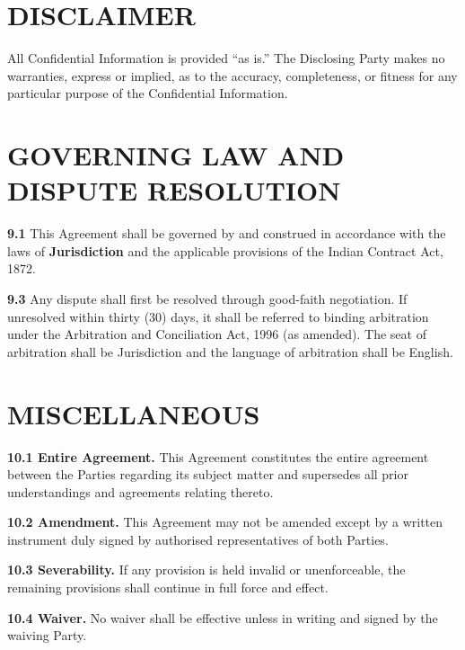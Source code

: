 \documentclass[10pt]{article}
\begin{document}
\section{DISCLAIMER}

All Confidential Information is provided ``as is.'' The Disclosing Party makes no warranties, express or implied, as to the accuracy, completeness, or fitness for any particular purpose of the Confidential Information.

\section{GOVERNING LAW AND DISPUTE RESOLUTION}

\textbf{9.1} This Agreement shall be governed by and construed in accordance with the laws of \textbf{{{Jurisdiction}}} and the applicable provisions of the Indian Contract Act, 1872.


\textbf{9.3} Any dispute shall first be resolved through good-faith negotiation. If unresolved within thirty (30) days, it shall be referred to binding arbitration under the Arbitration and Conciliation Act, 1996 (as amended). The seat of arbitration shall be {{Jurisdiction}} and the language of arbitration shall be English.

\section{MISCELLANEOUS}

\textbf{10.1 Entire Agreement.} This Agreement constitutes the entire agreement between the Parties regarding its subject matter and supersedes all prior understandings and agreements relating thereto.

\textbf{10.2 Amendment.} This Agreement may not be amended except by a written instrument duly signed by authorised representatives of both Parties.

\textbf{10.3 Severability.} If any provision is held invalid or unenforceable, the remaining provisions shall continue in full force and effect.

\textbf{10.4 Waiver.} No waiver shall be effective unless in writing and signed by the waiving Party.
\end{document}
